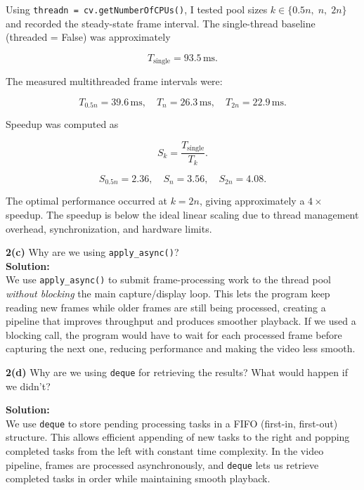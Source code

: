 \documentclass[11pt]{article}
\begin{document}
	Using \texttt{threadn = cv.getNumberOfCPUs()}, I tested pool sizes
	$k \in \{0.5n,\; n,\; 2n\}$ and recorded the steady-state frame interval.
	The single-thread baseline (threaded = False) was approximately
	
	\[
	T_{\text{single}} = 93.5\,\text{ms}.
	\]
	
	The measured multithreaded frame intervals were:
	
	\[
	T_{0.5n} = 39.6\,\text{ms}, \quad
	T_{n} = 26.3\,\text{ms}, \quad
	T_{2n} = 22.9\,\text{ms}.
	\]
	
	Speedup was computed as
	
	\[
	S_k = \frac{T_{\text{single}}}{T_k}.
	\]
	
	\[
	S_{0.5n} = 2.36, \quad
	S_{n} = 3.56, \quad
	S_{2n} = 4.08.
	\]
	
	The optimal performance occurred at $k = 2n$, giving approximately
	a $4\times$ speedup. The speedup is below the ideal linear scaling
	due to thread management overhead, synchronization, and hardware limits.
	
	\newpage
	
	\textbf{2(c)} Why are we using \texttt{apply\_async()}?\\
	
	\textbf{Solution:}\\
	We use \texttt{apply\_async()} to submit frame-processing work to the thread pool \emph{without blocking} the main capture/display loop. This lets the program keep reading new frames while older frames are still being processed, creating a pipeline that improves throughput and produces smoother playback. If we used a blocking call, the program would have to wait for each processed frame before capturing the next one, reducing performance and making the video less smooth.
	
	\newpage
	
	\textbf{2(d)} Why are we using \texttt{deque} for retrieving the results? What would happen if we didn’t?
	
	\textbf{Solution:}\\
	We use \texttt{deque} to store pending processing tasks in a FIFO (first-in, first-out) structure. This allows efficient appending of new tasks to the right and popping completed tasks from the left with constant time complexity. In the video pipeline, frames are processed asynchronously, and \texttt{deque} lets us retrieve completed tasks in order while maintaining smooth playback.\\
	
\end{document}
